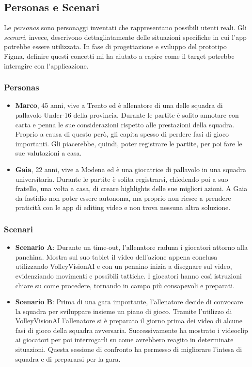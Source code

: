 \subsection{Personas e Scenari}
\label{subsec:personas_scenari}
\noindent Le \textit{personas} sono personaggi inventati che rappresentano possibili utenti reali. Gli \textit{scenari}, invece, descrivono dettagliatamente delle situazioni specifiche in cui l'app potrebbe essere utilizzata.
In fase di progettazione e sviluppo del prototipo Figma, definire questi concetti mi ha aiutato a capire come il target potrebbe interagire con l'applicazione.

\subsubsection{Personas}

\begin{itemize}
    \item \textbf{Marco}, 45 anni, vive a Trento ed è allenatore di una delle squadra di pallavolo Under-16 della provincia. Durante le partite è solito annotare con carta e penna le sue considerazioni rispetto alle prestazioni della squadra. Proprio a causa di questo però, gli capita spesso di perdere fasi di gioco importanti. Gli piacerebbe, quindi, poter registrare le partite, per poi fare le sue valutazioni a casa.  
     
    \item \textbf{Gaia}, 22 anni, vive a Modena ed è una giocatrice di pallavolo in una squadra universitaria. Durante le partite è solita registrarsi, chiedendo poi a suo fratello, una volta a casa, di creare highlights delle sue migliori azioni. A Gaia da fastidio non poter essere autonoma, ma proprio non riesce a prendere praticità con le app di editing video e non trova nessuna altra soluzione.
\end{itemize}

\subsubsection{Scenari}


\begin{itemize}
    \item \textbf{Scenario A}: Durante un time-out, l'allenatore raduna i giocatori attorno alla panchina. Mostra sul suo tablet il video dell'azione appena conclusa utilizzando VolleyVisionAI e con un pennino inizia a disegnare sul video, evidenziando movimenti e possibili tattiche. I giocatori hanno così istruzioni chiare su come procedere, tornando in campo più consapevoli e preparati.
    \item \textbf{Scenario B}: Prima di una gara importante, l'allenatore decide di convocare la squadra per sviluppare insieme un piano di gioco. Tramite l'utilizzo di VolleyVisionAI l'allenatore si è preparato il giorno prima dei video di alcune fasi di gioco della squadra avversaria. Successivamente ha mostrato i videoclip ai giocatori per poi interrogarli su come avrebbero reagito in determinate situazioni. Questa sessione di confronto ha permesso di migliorare l'intesa di squadra e di prepararsi per la gara.
\end{itemize}

